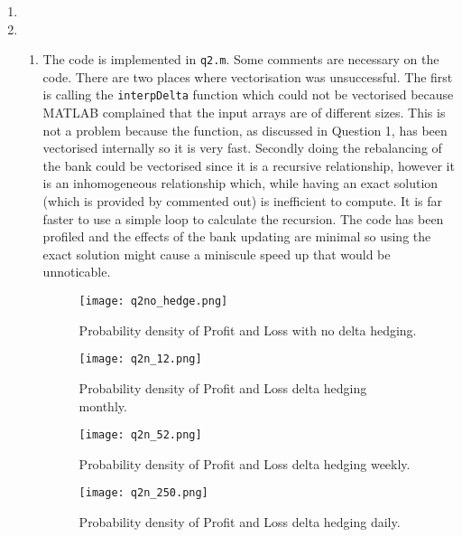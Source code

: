 \documentclass[10pt,english]{article}
\theoremstyle{plain}
\begin{document}
\begin{enumerate}
\item

\item
\begin{enumerate}
\item The code is implemented in \texttt{q2.m}. Some comments are necessary on the code. There are two places where vectorisation was unsuccessful. The first is calling the \texttt{interpDelta} function which could not be vectorised because MATLAB complained that the input arrays are of different sizes. This is not a problem because the function, as discussed in Question 1, has been vectorised internally so it is very fast. Secondly doing the rebalancing of the bank could be vectorised since it is a recursive relationship, however it is an inhomogeneous relationship which, while having an exact solution (which is provided by commented out) is inefficient to compute. It is far faster to use a simple loop to calculate the recursion. The code has been profiled and the effects of the bank updating are minimal so using the exact solution might cause a miniscule speed up that would be unnoticable.  
\begin{figure}
\begin{center}
\texttt{[image: q2no\_hedge.png]}
\caption{Probability density of Profit and Loss with no delta hedging.}
\label{nohedge}
\end{center}
\end{figure}
\begin{figure}
\begin{center}
\texttt{[image: q2n\_12.png]}
\caption{Probability density of Profit and Loss delta hedging monthly.}
\label{monthly}
\end{center}
\end{figure}
\begin{figure}
\begin{center}
\texttt{[image: q2n\_52.png]}
\caption{Probability density of Profit and Loss delta hedging weekly.} 
\label{weekly}
\end{center}
\end{figure}
\begin{figure}
\begin{center}
\texttt{[image: q2n\_250.png]}
\caption{Probability density of Profit and Loss delta hedging daily.}
\label{daily}
\end{center}
\end{figure}


\end{enumerate}
\end{enumerate}
\end{document}
